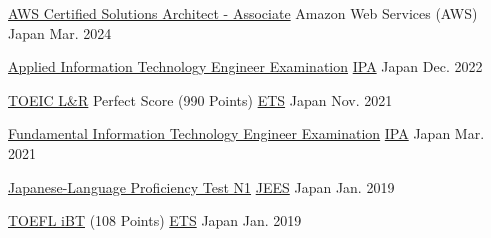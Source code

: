 
\begin{cvhonors}

  \cvhonor
  {\href{https://www.credly.com/badges/84c825b1-44c9-448f-9269-f0cb9fd1e15e/public_url}{AWS Certified Solutions Architect - Associate}} %
  {Amazon Web Services (AWS)} %
  {Japan} %
  {Mar. 2024} %


  \cvhonor
    {\href{https://www.ipa.go.jp/shiken/kubun/ap.html}{Applied Information Technology Engineer Examination}} %
    {\href{https://www.ipa.go.jp/index.html}{IPA}} %
    {Japan} %
    {Dec. 2022} %

  \cvhonor
    {\href{https://www.iibc-global.org/toeic.html}{TOEIC L\&R} Perfect Score (990 Points)} %
    {\href{https://www.ets.org/}{ETS}} %
    {Japan} %
    {Nov. 2021} %

  \cvhonor
    {\href{https://www.ipa.go.jp/shiken/kubun/fe.html}{Fundamental Information Technology Engineer Examination}} %
    {\href{https://www.ipa.go.jp/index.html}{IPA}} %
    {Japan} %
    {Mar. 2021} %

  \cvhonor
    {\href{https://www.jlpt.jp/}{Japanese-Language Proficiency Test N1}} %
    {\href{http://www.jees.or.jp/}{JEES}} %
    {Japan} %
    {Jan. 2019} %

  \cvhonor
    {\href{https://www.ets.org/toefl.html}{TOEFL iBT} (108 Points)} %
    {\href{https://www.ets.org/}{ETS}} %
    {Japan} %
    {Jan. 2019} %
\end{cvhonors}
